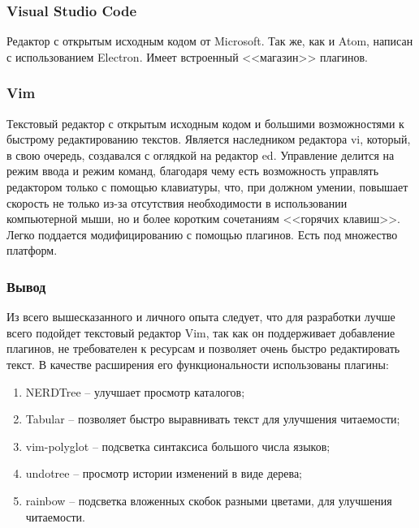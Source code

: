 \subsubsection{Visual Studio Code}\label{sec:ch2/sec1/sub2/sub4}
Редактор с открытым исходным кодом от Microsoft. Так же, как и Atom, написан с использованием Electron.
Имеет встроенный <<магазин>> плагинов.

\subsubsection{Vim}\label{sec:ch2/sec1/sub2/sub5}
Текстовый редактор с открытым исходным кодом и большими возможностями к
быстрому редактированию текстов. Является наследником редактора vi, который, в свою
очередь, создавался с оглядкой на редактор ed. Управление делится на
режим ввода и режим команд, благодаря чему есть возможность управлять 
редактором только с помощью клавиатуры, что, при должном умении, повышает скорость
не только из-за отсутствия необходимости в использовании компьютерной мыши, но и
более коротким сочетаниям  <<горячих клавиш>>. Легко поддается модифицированию с помощью плагинов.
Есть под множество платформ.


\subsubsection{Вывод}\label{sec:ch2/sec1/sub1/sub4}
Из всего вышесказанного и личного опыта следует, 
что для разработки {\ProgModule} лучше всего подойдет текстовый редактор Vim,
так как он поддерживает добавление плагинов, не требователен к ресурсам и позволяет
очень быстро редактировать текст. В качестве расширения его функциональности использованы
плагины:
\begin{enumerate}[label={\arabic*)}]
    \item NERDTree \autocite{nerdtree} -- улучшает просмотр каталогов;
    \item Tabular \autocite{tabular} -- позволяет быстро выравнивать текст
        для улучшения читаемости;
    \item vim-polyglot \autocite{vim-polyglot} -- подсветка синтаксиса большого
        числа языков;
    \item undotree \autocite{undotree} -- просмотр истории изменений в виде дерева;
    \item rainbow \autocite{rainbow} -- подсветка вложенных скобок разными цветами,
        для улучшения читаемости.
\end{enumerate}


